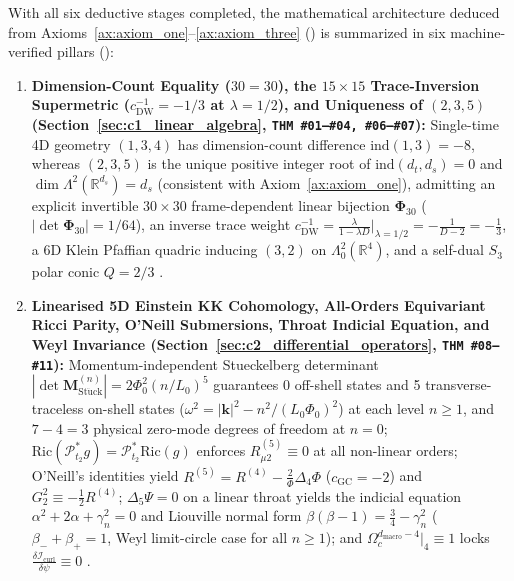 \documentclass[11pt,a4paper]{article}
\newcommand{\catA}{\text{\textbf{\textcolor{purple!80!black}{[A]}}}}
\newcommand{\catD}{\text{\textbf{\textcolor{blue!75!black}{[D]}}}}
\theoremstyle{definition}
\theoremstyle{plain}
\theoremstyle{remark}
\begin{document}
With all six deductive stages completed, the mathematical architecture deduced from Axioms~\ref{ax:axiom_one}--\ref{ax:axiom_three} (\catA) is summarized in six machine-verified pillars (\catD):
\begin{enumerate}[label=\arabic*.]
  \item \textbf{Dimension-Count Equality ($30 = 30$), the $15\times 15$ Trace-Inversion Supermetric ($c_{\mathrm{DW}}^{-1}=-1/3$ at $\lambda = 1/2$), and Uniqueness of $(2, 3, 5)$ (Section~\ref{sec:c1_linear_algebra}, \texttt{THM~\#01--\#04, \#06--\#07}):} Single-time 4D geometry $(1,3,4)$ has dimension-count difference $\mathrm{ind}(1,3) = -8$, whereas $(2,3,5)$ is the unique positive integer root of $\mathrm{ind}(d_t, d_s) = 0$ and $\dim\Lambda^2(\mathbb{R}^{d_s}) = d_s$ (consistent with Axiom~\ref{ax:axiom_one}), admitting an explicit invertible $30\times 30$ frame-dependent linear bijection $\bm{\Phi}_{30}$ ($|\det\bm{\Phi}_{30}|=1/64$), an inverse trace weight $c_{\mathrm{DW}}^{-1}=\frac{\lambda}{1-\lambda D}\big|_{\lambda=1/2}=-\frac{1}{D-2}=-\frac{1}{3}$, a 6D Klein Pfaffian quadric inducing $(3,2)$ on $\Lambda^2_0(\mathbb{R}^4)$, and a self-dual $S_3$ polar conic $Q = 2/3$ \catD.
  \item \textbf{Linearised 5D Einstein KK Cohomology, All-Orders Equivariant Ricci Parity, O'Neill Submersions, Throat Indicial Equation, and Weyl Invariance (Section~\ref{sec:c2_differential_operators}, \texttt{THM~\#08--\#11}):} Momentum-independent Stueckelberg determinant $|\det\mathbf{M}_{\mathrm{St\ddot{u}ck}}^{(n)}|=2\Phi_0^2(n/L_0)^5$ guarantees 0 off-shell states and 5 transverse-traceless on-shell states ($\omega^2 = |\mathbf{k}|^2 - n^2/(L_0\Phi_0)^2$) at each level $n \ge 1$, and $7 - 4 = 3$ physical zero-mode degrees of freedom at $n = 0$; $\mathrm{Ric}(\mathcal{P}_{t_2}^* g) = \mathcal{P}_{t_2}^*\mathrm{Ric}(g)$ enforces $R_{\mu 2}^{(5)} \equiv 0$ at all non-linear orders; O'Neill's identities yield $R^{(5)} = R^{(4)} - \frac{2}{\Phi}\Delta_4\Phi$ ($c_{\mathrm{GC}}=-2$) and $G^2_2 \equiv -\frac{1}{2}R^{(4)}$; $\Delta_5\Psi = 0$ on a linear throat yields the indicial equation $\alpha^2 + 2\alpha + \gamma_n^2 = 0$ and Liouville normal form $\beta(\beta - 1) = \frac{3}{4} - \gamma_n^2$ ($\beta_- + \beta_+ = 1$, Weyl limit-circle case for all $n \ge 1$); and $\Omega_c^{d_{\mathrm{macro}}-4}\big|_4 \equiv 1$ locks $\frac{\delta\mathcal{I}_{\mathrm{curl}}}{\delta\psi} \equiv 0$ \catD.

\end{enumerate}
\end{document}
